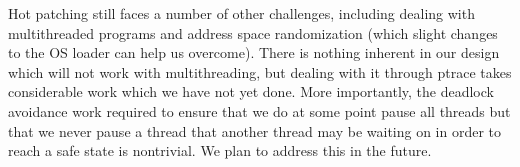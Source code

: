 Hot patching still faces a number of other
challenges, including dealing with multithreaded programs and address
space randomization (which slight changes to the OS loader can help us
overcome).  
There is nothing inherent in our design which will not work with
multithreading, but dealing with it through ptrace takes considerable
work which we have not yet done. More importantly, the deadlock
avoidance work required to ensure that we do at some point pause all
threads but that we never pause a thread that another thread may be
waiting on in order to reach a safe state is nontrivial. We plan to
address this in the future.
%

